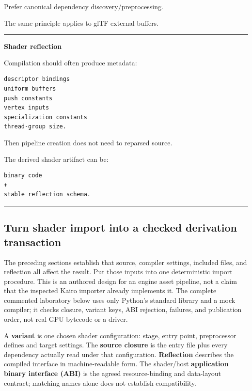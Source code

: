 Prefer canonical dependency discovery/preprocessing.

The same principle applies to glTF external buffers.

\begin{center}\rule{0.5\linewidth}{0.5pt}\end{center}

\textbf{Shader reflection}

Compilation should often produce metadata:

\begin{verbatim}
descriptor bindings
uniform buffers
push constants
vertex inputs
specialization constants
thread-group size.
\end{verbatim}

Then pipeline creation does not need to reparsed source.

The derived shader artifact can be:

\begin{verbatim}
binary code
+
stable reflection schema.
\end{verbatim}

\begin{center}\rule{0.5\linewidth}{0.5pt}\end{center}

\subsection{Turn shader import into a checked derivation transaction}\label{05-engine-i-ch010-turn-shader-import-into-a-checked-derivation-transaction}

\hypertarget{05-engine-i-ch010-turn-shader-import-into-a-checked-derivation-transaction}{}

The preceding sections establish that source, compiler settings, included files, and reflection all affect the result. Put those inputs into one deterministic import procedure. This is an authored design for an engine asset pipeline, not a claim that the inspected Kairo importer already implements it. The complete commented laboratory below uses only Python's standard library and a mock compiler; it checks closure, variant keys, ABI rejection, failures, and publication order, not real GPU bytecode or a driver.

A \textbf{variant} is one chosen shader configuration: stage, entry point, preprocessor defines and target settings. The \textbf{source closure} is the entry file plus every dependency actually read under that configuration. \textbf{Reflection} describes the compiled interface in machine-readable form. The shader/host \textbf{application binary interface (ABI)} is the agreed resource-binding and data-layout contract; matching names alone does not establish compatibility.

